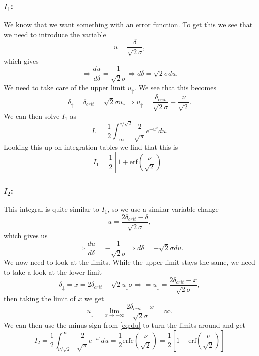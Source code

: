 \documentclass[a4paper,norsk, 10pt]{article}
\begin{document}
\subsubsection*{$I_1$:}
We know that we want something with an error function. To get this we see that we need to introduce the variable
\begin{equation}
u = \frac{\delta}{\sqrt{2}\sigma},
\end{equation}
which gives
\begin{equation}
\Rightarrow \frac{du}{d\delta} = \frac{1}{\sqrt{2}\sigma} \Rightarrow d\delta = \sqrt{2}\sigma du.
\end{equation}
We need to take care of the upper limit $u_{\uparrow}$. We see that this becomes
\begin{equation}
\delta_{\uparrow} = \delta_{crit} = \sqrt{2}\sigma u_{\uparrow} \Rightarrow u_{\uparrow} = \frac{\delta_{crit}}{\sqrt{2}\sigma} \equiv \frac{\nu}{\sqrt{2}}.
\end{equation}
We can then solve $I_1$ as
\begin{equation}
I_1 = \frac{1}{2}\int_{-\infty}^{\nu/\sqrt{2}} \frac{2}{\sqrt{\pi}}e^{-u^2} du.
\end{equation}
Looking this up on integration tables we find that this is
\begin{equation}
I_1 = \frac{1}{2}\left[1+\text{erf}\left(\frac{\nu}{\sqrt{2}}\right)\right]
\end{equation}
\subsubsection*{$I_2$:}
This integral is quite similar to $I_1$, so we use a similar variable change
\begin{equation}
u = \frac{2\delta_{crit}-\delta}{\sqrt{2}\sigma},
\end{equation}
which gives us
\begin{equation}\label{eq:du}
\Rightarrow \frac{du}{d\delta} = -\frac{1}{\sqrt{2}\sigma} \Rightarrow d\delta = -\sqrt{2}\sigma du.
\end{equation}
We now need to look at the limits. While the upper limit stays the same, we need to take a look at the lower limit
\begin{equation}
\delta_{\downarrow} = x = 2\delta_{crit} - \sqrt{2}u_{\downarrow}\sigma \Rightarrow = u_{\downarrow} = \frac{2\delta_{crit} - x}{\sqrt{2}\sigma}, 
\end{equation}
then taking the limit of $x$ we get
\begin{equation}
u_{\downarrow} =\lim_{x \rightarrow -\infty} \frac{2\delta_{crit} - x}{\sqrt{2}\sigma} = \infty.
\end{equation}
We can then use the minus sign from \eqref{eq:du} to turn the limits around and get
\begin{equation}
I_2 = \frac{1}{2}\int_{\nu/\sqrt{2}}^{\infty}\frac{2}{\sqrt{\pi}}e^{-u^2} du = \frac{1}{2}\text{erfc}\left(\frac{\nu}{\sqrt{2}}\right) = \frac{1}{2}\left[1-\text{erf}\left(\frac{\nu}{\sqrt{2}}\right)\right]
\end{equation}
\end{document}
